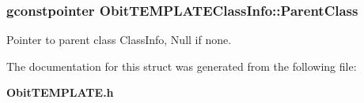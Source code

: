 \subsubsection{\setlength{\rightskip}{0pt plus 5cm}gconstpointer {\bf Obit\-TEMPLATEClass\-Info::Parent\-Class}}\label{structObitTEMPLATEClassInfo_o3}


Pointer to parent class Class\-Info, Null if none. 



The documentation for this struct was generated from the following file:\begin{CompactItemize}
\item 
{\bf Obit\-TEMPLATE.h}\end{CompactItemize}
